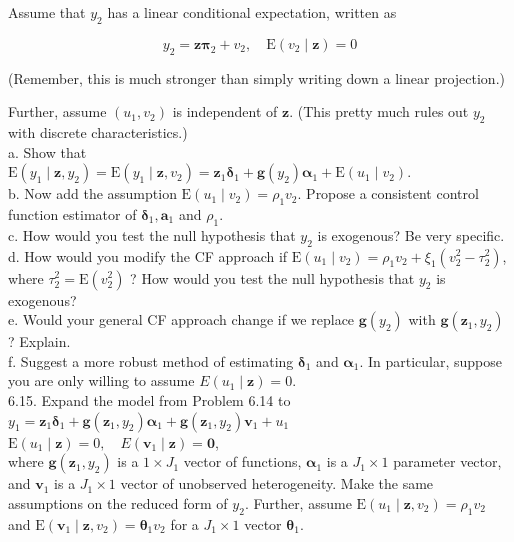 \documentclass[10pt]{article}
\begin{document}
Assume that $y_{2}$ has a linear conditional expectation, written as

$$
y_{2}=\mathbf{z} \boldsymbol{\pi}_{2}+v_{2}, \quad \mathrm{E}\left(v_{2} \mid \mathbf{z}\right)=0
$$

(Remember, this is much stronger than simply writing down a linear projection.)

Further, assume $\left(u_{1}, v_{2}\right)$ is independent of $\mathbf{z}$. (This pretty much rules out $y_{2}$ with discrete characteristics.)\\
a. Show that\\
$\mathrm{E}\left(y_{1} \mid \mathbf{z}, y_{2}\right)=\mathrm{E}\left(y_{1} \mid \mathbf{z}, v_{2}\right)=\mathbf{z}_{1} \boldsymbol{\delta}_{1}+\mathbf{g}\left(y_{2}\right) \boldsymbol{\alpha}_{1}+\mathrm{E}\left(u_{1} \mid v_{2}\right)$.\\
b. Now add the assumption $\mathrm{E}\left(u_{1} \mid v_{2}\right)=\rho_{1} v_{2}$. Propose a consistent control function estimator of $\boldsymbol{\delta}_{1}, \boldsymbol{a}_{1}$ and $\rho_{1}$.\\
c. How would you test the null hypothesis that $y_{2}$ is exogenous? Be very specific.\\
d. How would you modify the CF approach if $\mathrm{E}\left(u_{1} \mid v_{2}\right)=\rho_{1} v_{2}+\xi_{1}\left(v_{2}^{2}-\tau_{2}^{2}\right)$, where $\tau_{2}^{2}=\mathrm{E}\left(v_{2}^{2}\right)$ ? How would you test the null hypothesis that $y_{2}$ is exogenous?\\
e. Would your general CF approach change if we replace $\mathbf{g}\left(y_{2}\right)$ with $\mathbf{g}\left(\mathbf{z}_{1}, y_{2}\right)$ ? Explain.\\
f. Suggest a more robust method of estimating $\boldsymbol{\delta}_{1}$ and $\boldsymbol{\alpha}_{1}$. In particular, suppose you are only willing to assume $E\left(u_{1} \mid \mathbf{z}\right)=0$.\\
6.15. Expand the model from Problem 6.14 to\\
$y_{1}=\mathbf{z}_{1} \boldsymbol{\delta}_{1}+\mathbf{g}\left(\mathbf{z}_{1}, y_{2}\right) \boldsymbol{\alpha}_{1}+\mathbf{g}\left(\mathbf{z}_{1}, y_{2}\right) \mathbf{v}_{1}+u_{1}$\\
$\mathrm{E}\left(u_{1} \mid \mathbf{z}\right)=0, \quad E\left(\mathbf{v}_{1} \mid \mathbf{z}\right)=\mathbf{0}$,\\
where $\mathbf{g}\left(\mathbf{z}_{1}, y_{2}\right)$ is a $1 \times J_{1}$ vector of functions, $\boldsymbol{\alpha}_{1}$ is a $J_{1} \times 1$ parameter vector, and $\mathbf{v}_{1}$ is a $J_{1} \times 1$ vector of unobserved heterogeneity. Make the same assumptions on the reduced form of $y_{2}$. Further, assume $\mathrm{E}\left(u_{1} \mid \mathbf{z}, v_{2}\right)=\rho_{1} v_{2}$ and $\mathrm{E}\left(\mathbf{v}_{1} \mid \mathbf{z}, v_{2}\right)=\boldsymbol{\theta}_{1} v_{2}$ for a $J_{1} \times 1$ vector $\boldsymbol{\theta}_{1}$.\\
\end{document}
